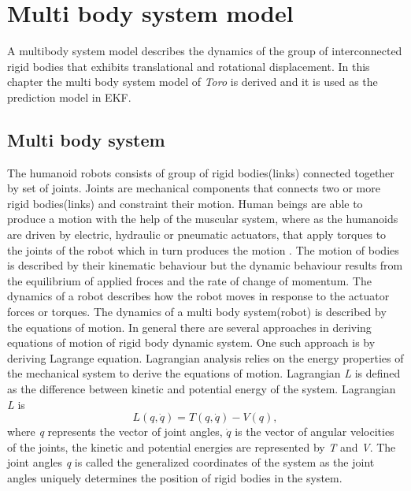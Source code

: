 \chapter{Multi body system model}
\label{chap:multi_mdl}
A multibody system model describes the dynamics of the group of interconnected rigid bodies that exhibits translational and rotational displacement. In this chapter the multi body system model of \emph{Toro} is derived and it is used as the prediction model in EKF.

\section{Multi body system}
The humanoid robots consists of group of rigid bodies(links) connected together by set of joints. Joints are mechanical components that connects two or more rigid bodies(links) and constraint their motion. Human beings are able to produce a motion with the help of the muscular system, where as the humanoids are driven by electric, hydraulic or pneumatic actuators, that apply torques to the joints of the robot which in turn produces the motion \cite[Chapter 2]{mur94}. The motion of bodies is described by their kinematic behaviour but the dynamic behaviour results from the equilibrium of applied froces and the rate of change of momentum. The dynamics of a robot describes how the robot moves in response to the actuator forces or torques. The dynamics of a multi body system(robot) is described by the equations of motion. In general there are several approaches in deriving equations of motion of rigid body dynamic system. One such approach is by deriving Lagrange equation. Lagrangian analysis relies on the energy properties of the mechanical system to derive the equations of motion. Lagrangian \emph{L} is defined as the difference between kinetic and potential energy of the system. Lagrangian \emph{L} is $$ L(q,\dot{q}) = T(q,\dot{q}) - V(q),$$ 
where \emph{q} represents the vector of joint angles, $\dot{q}$ is the vector of angular velocities of the joints, the kinetic and potential energies are represented by \emph{T} and \emph{V}. The joint angles \emph{q} is called the generalized coordinates of the system as the joint angles uniquely determines the position of rigid bodies in the system.


